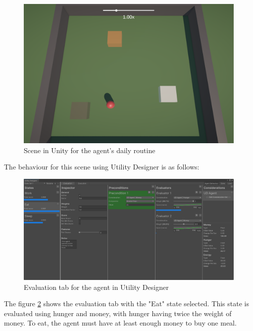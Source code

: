 \begin{figure}[H]
	\centering
		\includegraphics[scale=0.2]{images/utility_designer_daily_routine.png}
	\caption{Scene in Unity for the agent's daily routine}
	\label{fig:utility_designer_daily_routine}
\end{figure}

\newpage

The behaviour for this scene using Utility Designer is as follows:

\begin{figure}[H]
	\centering
		\includegraphics[scale=0.38]{images/utility_designer_daily_routine_evaluation.png}
	\caption{Evaluation tab for the agent in Utility Designer}
	\label{fig:utility_designer_daily_routine_evaluation}
\end{figure}

The figure \ref{fig:utility_designer_daily_routine_evaluation} shows the evaluation tab with the "Eat" state selected. This state is evaluated using hunger and money, with hunger having twice the weight of money. To eat, the agent must have at least enough money to buy one meal.

